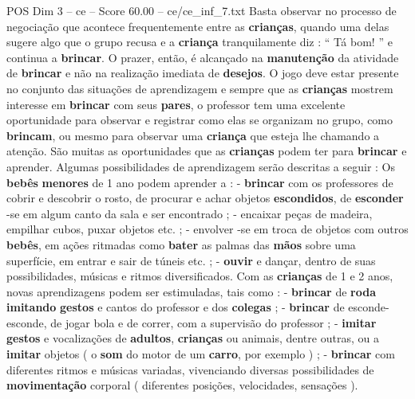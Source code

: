 \begin{textsample}{POS Dim 3 – ce – Score 60.00 – ce/ce\_inf\_7.txt}
Basta observar no processo de negociação que acontece frequentemente entre as \textbf{crianças}, quando uma delas sugere algo que o grupo recusa e a \textbf{criança} tranquilamente diz : “ Tá bom! ” e continua a \textbf{brincar}.
O prazer, então, é alcançado na \textbf{manutenção} da atividade de \textbf{brincar} e não na realização imediata de \textbf{desejos}.
O jogo deve estar presente no conjunto das situações de aprendizagem e sempre que as \textbf{crianças} mostrem interesse em \textbf{brincar} com seus \textbf{pares}, o professor tem uma excelente oportunidade para observar e registrar como elas se organizam no grupo, como \textbf{brincam}, ou mesmo para observar uma \textbf{criança} que esteja lhe chamando a atenção.
São muitas as oportunidades que as \textbf{crianças} podem ter para \textbf{brincar} e aprender.
Algumas possibilidades de aprendizagem serão descritas a seguir : Os \textbf{bebês} \textbf{menores} de 1 ano podem aprender a : - \textbf{brincar} com os professores de cobrir e descobrir o rosto, de procurar e achar objetos \textbf{escondidos}, de \textbf{esconder} -se em algum canto da sala e ser encontrado ; - encaixar peças de madeira, empilhar cubos, puxar objetos etc. ; - envolver -se em troca de objetos com outros \textbf{bebês}, em ações ritmadas como \textbf{bater} as palmas das \textbf{mãos} sobre uma superfície, em entrar e sair de túneis etc. ; - \textbf{ouvir} e dançar, dentro de suas possibilidades, músicas e ritmos diversificados.
Com as \textbf{crianças} de 1 e 2 anos, novas aprendizagens podem ser estimuladas, tais como : - \textbf{brincar} de \textbf{roda} \textbf{imitando} \textbf{gestos} e cantos do professor e dos \textbf{colegas} ; - \textbf{brincar} de esconde-esconde, de jogar bola e de correr, com a supervisão do professor ; - \textbf{imitar} \textbf{gestos} e vocalizações de \textbf{adultos}, \textbf{crianças} ou animais, dentre outras, ou a \textbf{imitar} objetos ( o \textbf{som} do motor de um \textbf{carro}, por exemplo ) ; - \textbf{brincar} com diferentes ritmos e músicas variadas, vivenciando diversas possibilidades de \textbf{movimentação} corporal ( diferentes posições, velocidades, sensações ).

\end{textsample}
